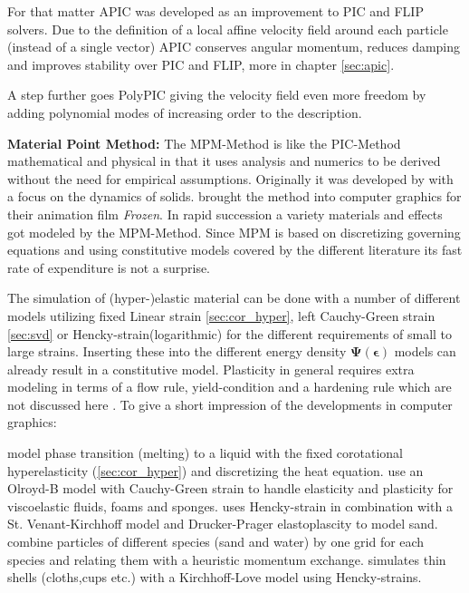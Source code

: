 \documentclass[m,times]{cgMA}
\begin{document}
For that matter APIC was developed as an improvement to PIC and FLIP solvers. Due to the definition of a local affine velocity field around each particle (instead of a single vector) APIC conserves angular momentum, reduces damping and improves stability over PIC and FLIP, more in chapter \ref{sec:apic}. \cite{MPM:APIC} \cite{MPM:OLD_APIC}

A step further goes PolyPIC giving the velocity field even more freedom by adding polynomial modes of increasing order to the description. \cite{MPM:POLYPIC}

\textbf{Material Point Method:} The MPM-Method is like the PIC-Method mathematical and physical in that it uses analysis and numerics to be derived without the need for empirical assumptions. Originally it was developed by \cite{sulsky1995application} with a focus on the dynamics of solids. \cite{MPM:SNOW} brought the method into computer graphics for their animation film \textit{Frozen}. In rapid succession a variety materials and effects got modeled by the MPM-Method. Since MPM is based on discretizing governing equations and using constitutive models covered by the different literature its fast rate of expenditure is not a surprise.

The simulation of (hyper-)elastic material can be done with a number of different models utilizing fixed Linear strain \ref{sec:cor_hyper}, left Cauchy-Green strain \ref{sec:svd} or Hencky-strain(logarithmic) \cite{MPM:SHELLS} for the different requirements of small to large strains. Inserting these into the different energy density $\boldsymbol{\Psi}(\boldsymbol{\epsilon})$ models can already result in a constitutive model. Plasticity in general requires extra modeling in terms of a flow rule, yield-condition and a hardening rule which are not discussed here \cite{ochsner2014elasto}. To give a short impression of the developments in computer graphics:

\cite{MPM:PHASE_CHANGE} model phase transition (melting) to a liquid with the fixed corotational hyperelasticity (\ref{sec:cor_hyper}) and discretizing the heat equation. \cite{MPM:OLROYDB} use an Olroyd-B model with Cauchy-Green strain to handle elasticity and plasticity for viscoelastic fluids, foams and sponges. \cite{MPM:DRUCKER} uses Hencky-strain in combination with a St. Venant-Kirchhoff model and Drucker-Prager elastoplascity to model sand.
\cite{MPM:MULTI} combine particles of different species (sand and water) by one grid for each species and relating them with a heuristic momentum exchange. \cite{MPM:SHELLS} simulates thin shells (cloths,cups etc.) with a Kirchhoff-Love model using Hencky-strains.
\\
\end{document}
